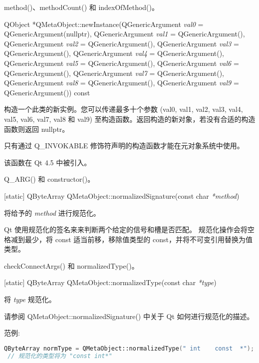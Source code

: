 \begin{seeAlso}
method()、methodCount() 和 indexOfMethod()。
\end{seeAlso}

QObject *QMetaObject::newInstance(QGenericArgument \emph{val0} = QGenericArgument(nullptr), QGenericArgument \emph{val1} = QGenericArgument(), 
    QGenericArgument \emph{val2} = QGenericArgument(), QGenericArgument \emph{val3} = QGenericArgument(), 
    QGenericArgument \emph{val4} = QGenericArgument(), QGenericArgument \emph{val5} = QGenericArgument(), 
    QGenericArgument \emph{val6} = QGenericArgument(), QGenericArgument \emph{val7} = QGenericArgument(), 
    QGenericArgument \emph{val8} = QGenericArgument(), QGenericArgument \emph{val9} = QGenericArgument()) const

构造一个此类的新实例。您可以传递最多十个参数 (val0, val1, val2, val3, val4, val5, val6, val7, val8 和 val9) 至构造函数。返回构造的新对象，若没有合适的构造函数则返回 nullptr。

\begin{notice}
只有通过 Q\_INVOKABLE 修饰符声明的构造函数才能在元对象系统中使用。
\end{notice}

该函数在 Qt 4.5 中被引入。

\begin{seeAlso}
Q\_ARG() 和 constructor()。
\end{seeAlso}

[static] QByteArray QMetaObject::normalizedSignature(const char \emph{*method})

将给予的 \emph{method} 进行规范化。

Qt 使用规范化的签名来来判断两个给定的信号和槽是否匹配。
规范化操作会将空格减到最少，将 const 适当前移，移除值类型的 const，并将不可变引用替换为值类型。

\begin{seeAlso}
checkConnectArgs() 和 normalizedType()。
\end{seeAlso}

[static] QByteArray QMetaObject::normalizedType(const char \emph{*type})

将 \emph{type} 规范化。

请参阅 QMetaObject::normalizedSignature() 中关于 Qt 如何进行规范化的描述。

范例:

\begin{lstlisting}[language=C++]
 QByteArray normType = QMetaObject::normalizedType(" int    const  *");
 // 规范化的类型将为 "const int*"
\end{lstlisting}

